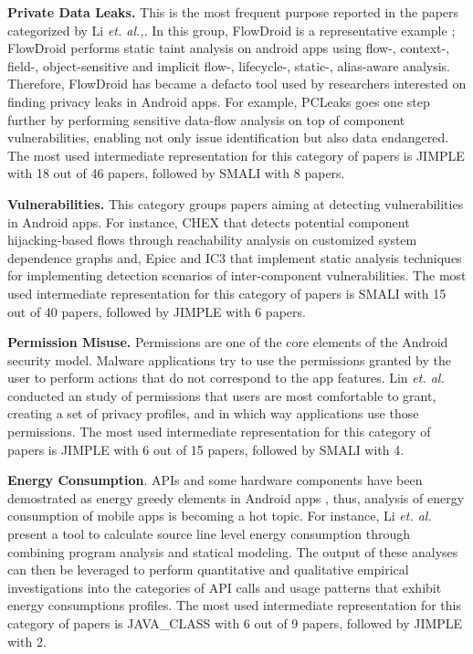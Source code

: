 
\textbf{Private Data Leaks.} This is the most frequent purpose reported in the papers categorized by Li \textit{et. al.,}. In this group, FlowDroid is a representative example \cite{Arzt:2014}; FlowDroid  performs static taint analysis on android apps using flow-, context-, field-, object-sensitive and implicit flow-, lifecycle-, static-, alias-aware analysis. Therefore, FlowDroid has became a defacto tool used by researchers interested on finding privacy leaks in Android apps. For example, PCLeaks \cite{li:TrustCom2014} goes one step further by performing sensitive data-flow analysis on top of component vulnerabilities, enabling not only issue identification but also data endangered. The most used intermediate representation for this category of papers is JIMPLE with 18 out of 46 papers, followed by SMALI with 8 papers.

\textbf{Vulnerabilities.} This category groups papers aiming at detecting vulnerabilities in Android apps. For instance,  CHEX\cite{lu:CCS2012} that detects potential component hijacking-based flows through reachability analysis on customized system dependence graphs and, Epicc \cite{octeau:Security2013} and IC3 \cite{octeau:ICSE2015} that implement static analysis techniques for implementing detection scenarios of inter-component vulnerabilities. The most used intermediate representation for this category of papers is SMALI with 15 out of 40 papers, followed by JIMPLE with 6 papers.

\textbf{Permission Misuse.} Permissions are one of the core elements of the Android security model. Malware applications try to use the permissions granted by the user to perform actions that do not correspond to the app features. Lin \textit{et. al.} \cite{lin2014modeling} conducted an study of  permissions that users are most comfortable to grant, creating a set of privacy profiles, and in which way applications use those permissions. The most used intermediate representation for this category of papers is JIMPLE with 6 out of 15 papers, followed by SMALI with 4.

\textbf{Energy Consumption}.  APIs and some hardware components have been demostrated as energy greedy elements in Android apps \cite{Linares-Vasquez:2014,Pathak:2011}, thus, analysis of energy consumption of mobile apps is becoming a hot topic. For instance, Li \textit{et. al.} \cite{li:ISSTA2013} present a tool to calculate source line level energy consumption through combining program analysis and statical modeling. The output of these analyses can then be leveraged to perform quantitative and qualitative empirical investigations into the categories of API calls and usage patterns that exhibit energy consumptions profiles. The most used intermediate representation for this category of papers is JAVA\_CLASS with 6 out of 9 papers, followed by JIMPLE with 2.

